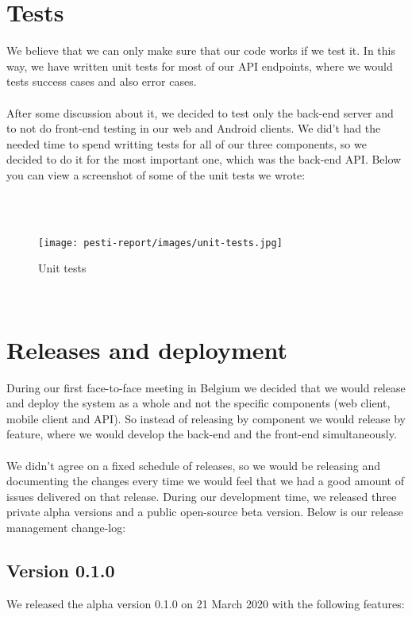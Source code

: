 \section{Tests}

We believe that we can only make sure that our code works if we test it. In this way, we have written unit tests for most of our API endpoints, where we would tests success cases and also error cases.
\\ \\
After some discussion about it, we decided to test only the back-end server and to not do front-end testing in our web and Android clients. We did't had the needed time to spend writting tests for all of our three components, so we decided to do it for the most important one, which was the back-end API. Below you can view a screenshot of some of the unit tests we wrote:


\\ \\
\begin{figure}[H]
	\centering
	\texttt{[image: pesti-report/images/unit-tests.jpg]}
	\caption{Unit tests}
	\label{fig:unit-tests}
\end{figure}
\\

\section{Releases and deployment}

During our first face-to-face meeting in Belgium we decided that we would release and deploy the system as a whole and not the specific components (web client, mobile client and API). So instead of releasing by component we would release by feature, where we would develop the back-end and the front-end simultaneously.
\\ \\
We didn't agree on a fixed schedule of releases, so we would be releasing and documenting the changes every time we would feel that we had a good amount of issues delivered on that release. During our development time, we released three private alpha versions and a public open-source beta version. Below is our release management change-log:

\subsection{Version 0.1.0}

We released the alpha version 0.1.0 on 21 March 2020 with the following features:

